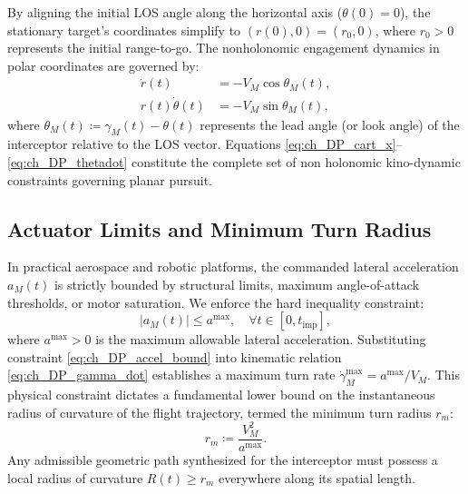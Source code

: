 By aligning the initial LOS angle along the horizontal axis ($\theta(0) = 0$), the stationary target's coordinates simplify to $(r(0), 0) = (r_0, 0)$, where $r_0 > 0$ represents the initial range-to-go. The nonholonomic engagement dynamics in polar coordinates are governed by:
\begin{align}
	\dot{r}(t) &= -V_M \cos \theta_M(t), \label{eq:ch_DP_rdot} \\
	r(t) \dot{\theta}(t) &= -V_M \sin \theta_M(t), \label{eq:ch_DP_thetadot}
\end{align}
where $\theta_M(t) \coloneqq \gamma_M(t) - \theta(t)$ represents the lead angle (or look angle) of the interceptor relative to the LOS vector. Equations \eqref{eq:ch_DP_cart_x}--\eqref{eq:ch_DP_thetadot} constitute the complete set of non holonomic kino-dynamic constraints governing planar pursuit.
\subsection{Actuator Limits and Minimum Turn Radius}\label{subsec:ch_DP_actuator_limits}
In practical aerospace and robotic platforms, the commanded lateral acceleration $a_M(t)$ is strictly bounded by structural limits, maximum angle-of-attack thresholds, or motor saturation. We enforce the hard inequality constraint:
\begin{equation}\label{eq:ch_DP_accel_bound}
	|a_M(t)| \le a^{\max}, \quad \forall t \in [0, t_{\text{imp}}],
\end{equation}
where $a^{\max} > 0$ is the maximum allowable lateral acceleration. Substituting constraint \eqref{eq:ch_DP_accel_bound} into kinematic relation \eqref{eq:ch_DP_gamma_dot} establishes a maximum turn rate $\dot{\gamma}_M^{\max} = a^{\max} / V_M$. This physical constraint dictates a fundamental lower bound on the instantaneous radius of curvature of the flight trajectory, termed the minimum turn radius $r_m$:
\begin{equation}\label{eq:ch_DP_min_radius}
	r_m \coloneqq \frac{V_M^2}{a^{\max}}.
\end{equation}
Any admissible geometric path synthesized for the interceptor must possess a local radius of curvature $R(t) \ge r_m$ everywhere along its spatial length.
